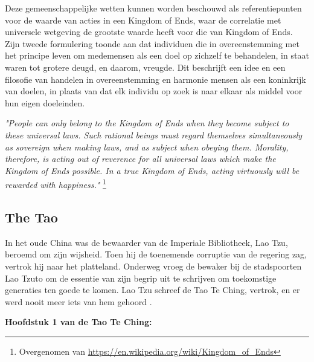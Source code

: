 \documentclass[11pt]{article}
\begin{document}
\noindent Deze gemeenschappelijke wetten kunnen worden beschouwd als referentiepunten voor de waarde van acties in een Kingdom of Ends, waar de correlatie met universele wetgeving de grootste waarde heeft voor die van Kingdom of Ends. Zijn tweede formulering toonde aan dat individuen die in overeenstemming met het principe leven om medemensen als een doel op zichzelf te behandelen, in staat waren tot grotere deugd, en daarom, vreugde. Dit beschrijft een idee en een filosofie van handelen in overeenstemming en harmonie mensen als een koninkrijk van doelen, in plaats van dat elk individu op zoek is naar elkaar als middel voor hun eigen doeleinden.

\bigskip
\textit{"People can only belong to the Kingdom of Ends when they become subject to these universal laws. Such rational beings must regard themselves simultaneously as sovereign when making laws, and as subject when obeying them. Morality,  therefore, is acting out of reverence for all universal laws which make the Kingdom of Ends  possible. In a true Kingdom of Ends, acting virtuously will be rewarded with happiness."} \footnote{Overgenomen van \url{https://en.wikipedia.org/wiki/Kingdom_of_Ends}}

\subsection{The Tao}

In het oude China was de bewaarder van de Imperiale Bibliotheek, Lao Tzu, beroemd om zijn wijsheid. Toen hij de toenemende corruptie van de regering zag, vertrok hij naar het platteland. Onderweg vroeg de bewaker bij de stadspoorten Lao Tzuto om de essentie van zijn begrip uit te schrijven om toekomstige generaties ten goede te komen. Lao Tzu schreef de Tao Te Ching, vertrok, en er werd nooit meer iets van hem gehoord \cite{tao_introduction}.

\medskip
\begin{center}
\textbf{\cite{tao_chapter1} Hoofdstuk 1 van de Tao Te Ching:}
\end{center}
\end{document}

